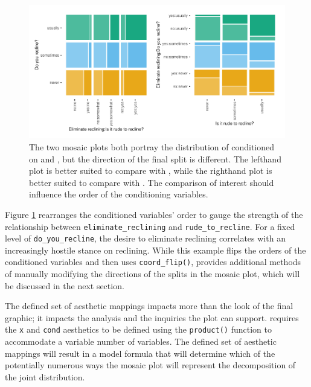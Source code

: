 \begin{figure}

{\centering \includegraphics[width=1\linewidth]{jeppson-hofmann_files/figure-latex/conds-orders-1} 

}

\caption{The two mosaic plots both portray the distribution of  conditioned on  and , but the direction of the final split is different. The lefthand plot is better suited to compare  with , while the righthand plot is better suited to compare  with . The comparison of interest should influence the order of the conditioning variables.}\label{fig:conds-orders}
\end{figure}

Figure \ref{fig:conds-orders} rearranges the conditioned variables' order to gauge the strength of the relationship between \texttt{eliminate\_reclining} and \texttt{rude\_to\_recline}. For a fixed level of \texttt{do\_you\_recline}, the desire to eliminate reclining correlates with an increasingly hostile stance on reclining. While this example flips the orders of the conditioned variables and then uses \texttt{coord\_flip()},  provides additional methods of manually modifying the directions of the splits in the mosaic plot, which will be discussed in the next section.

The defined set of aesthetic mappings impacts more than the look of the final graphic; it impacts the analysis and the inquiries the plot can support.  requires the \texttt{x} and \texttt{cond} aesthetics to be defined using the \texttt{product()} function to accommodate a variable number of variables. The defined set of aesthetic mappings will result in a model formula that will determine which of the potentially numerous ways the mosaic plot will represent the decomposition of the joint distribution.

